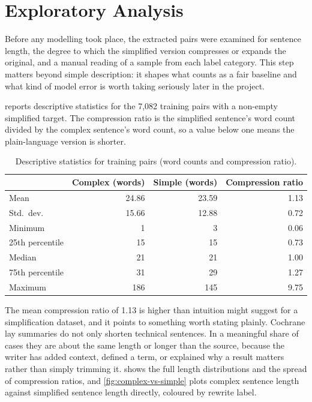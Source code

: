 \section{Exploratory Analysis}
\label{sec:eda}

Before any modelling took place, the extracted pairs were examined for sentence length, the degree to which the simplified version compresses or expands the original, and a manual reading of a sample from each label category. This step matters beyond simple description: it shapes what counts as a fair baseline and what kind of model error is worth taking seriously later in the project.

 reports descriptive statistics for the 7{,}082 training pairs with a non-empty simplified target. The compression ratio is the simplified sentence's word count divided by the complex sentence's word count, so a value below one means the plain-language version is shorter.

\begin{table}[htbp]
    \centering
    \caption{Descriptive statistics for training pairs (word counts and compression ratio).}
    \label{tab:eda-summary}
    \begin{tabular}{@{}lrrr@{}}
        \toprule
         & \textbf{Complex (words)} & \textbf{Simple (words)} & \textbf{Compression ratio} \\
        \midrule
        Mean   & 24.86 & 23.59 & 1.13 \\
        Std.\ dev. & 15.66 & 12.88 & 0.72 \\
        Minimum & 1     & 3     & 0.06 \\
        25th percentile & 15 & 15 & 0.73 \\
        Median & 21    & 21    & 1.00 \\
        75th percentile & 31 & 29 & 1.27 \\
        Maximum & 186   & 145   & 9.75 \\
        \bottomrule
    \end{tabular}
\end{table}

The mean compression ratio of 1.13 is higher than intuition might suggest for a simplification dataset, and it points to something worth stating plainly. Cochrane lay summaries do not only shorten technical sentences. In a meaningful share of cases they are about the same length or longer than the source, because the writer has added context, defined a term, or explained why a result matters rather than simply trimming it.  shows the full length distributions and the spread of compression ratios, and \cref{fig:complex-vs-simple} plots complex sentence length against simplified sentence length directly, coloured by rewrite label.

